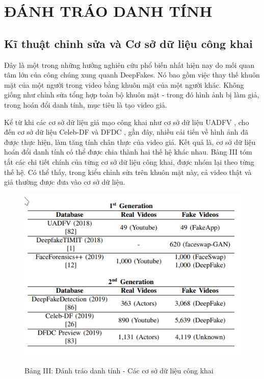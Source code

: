 \documentclass{article}
\begin{document}
\section{ĐÁNH TRÁO DANH TÍNH}

\subsection{Kĩ thuật chỉnh sửa và Cơ sở dữ liệu công khai}

Đây là một trong những hướng nghiên cứu phổ biến nhất hiện nay do mối quan tâm lớn của công chúng xung quanh DeepFakes. Nó bao gồm việc thay thế khuôn mặt của một người trong video bằng khuôn mặt của một người khác. Không giống như chỉnh sửa tổng hợp toàn bộ khuôn mặt - trong đó hình ảnh bị làm giả, trong hoán đổi danh tính, mục tiêu là tạo video giả.

Kể từ khi các cơ sở dữ liệu giả mạo công khai như cơ sở dữ liệu UADFV , cho đến cơ sở dữ liệu Celeb-DF và DFDC ,  gần đây, nhiều cải tiến về hình ảnh đã được thực hiện, làm tăng tính chân thực của video giả. Kết quả là, cơ sở dữ liệu hoán đổi danh tính có thể được chia thành hai thế hệ khác nhau. Bảng III tóm tắt các chi tiết chính của từng cơ sở dữ liệu công khai, được nhóm lại theo từng thế hệ. Có thể thấy, trong kiểu chỉnh sửa trên khuôn mặt này, cả video thật và giả thường được đưa vào cơ sở dữ liệu.

\begin{figure}[h!]
\caption{Bảng III: Đánh tráo danh tính - Các cơ sở dữ liệu công khai}
\includegraphics[width=\columnwidth]{table-3-database}
\label{table-3-database}
\end{figure}
\end{document}
